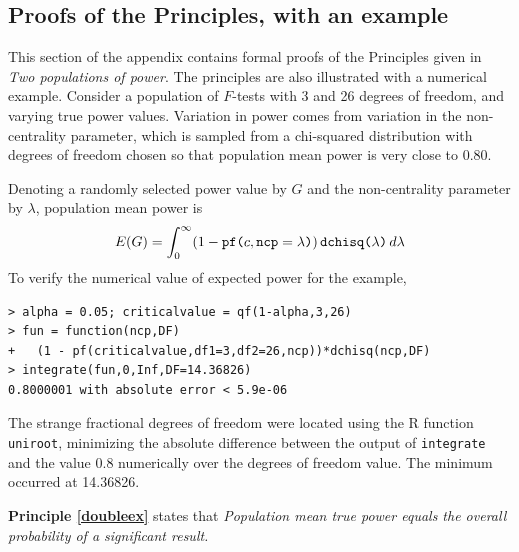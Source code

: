 \documentclass[jou]{apa6} %
\newcommand{\R}[1]{\mbox{\texttt{#1}}} %
\begin{document}
\subsection{Proofs of the Principles, with an example}

This section of the appendix contains formal proofs of the Principles given in \emph{Two populations of power}. The principles are also illustrated with a numerical example. Consider a population of $F$-tests with 3 and 26 degrees of freedom, and varying true power values. Variation in power comes from variation in the non-centrality parameter, which is sampled from a chi-squared distribution with degrees of freedom chosen so that population mean power is very close to 0.80. 

Denoting a randomly selected power value by $G$ and the non-centrality parameter by $\lambda$, population mean power is
\begin{displaymath}
    E(G) =  \int_0^\infty (1-\R{pf(}c,\R{ncp}=\lambda\R{)})  \, \R{dchisq(}\lambda\R{)} \, d\lambda
\end{displaymath}
To verify the numerical value of expected power for the example,
{\footnotesize
\begin{verbatim}
> alpha = 0.05; criticalvalue = qf(1-alpha,3,26)
> fun = function(ncp,DF)
+   (1 - pf(criticalvalue,df1=3,df2=26,ncp))*dchisq(ncp,DF)
> integrate(fun,0,Inf,DF=14.36826)
0.8000001 with absolute error < 5.9e-06
\end{verbatim}
} %
\noindent
The strange fractional degrees of freedom were located using the R function \texttt{uniroot}, minimizing the absolute difference between the output of \texttt{integrate} and the value 0.8 numerically over the degrees of freedom value. The minimum occurred at 14.36826.

\textbf{Principle \ref{doubleex}} states that \emph{Population mean true power equals the overall probability of a significant result.}
\end{document}

